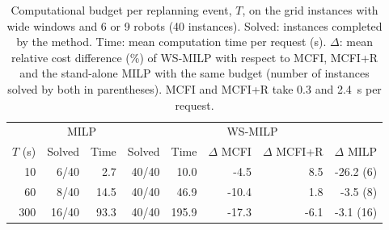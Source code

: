 {\color{red}
\begin{table}[htb]
\centering
\caption{Computational budget per replanning event, $T$, on the grid instances with wide windows and 6 or 9 robots (40 instances). Solved: instances completed by the method. Time: mean computation time per request (s). $\Delta$: mean relative cost difference (\%) of WS-MILP with respect to MCFI, MCFI+R and the stand-alone MILP with the same budget (number of instances solved by both in parentheses). MCFI and MCFI+R take 0.3 and 2.4~s per request.}
\label{tab:budget}
\begin{tabular}{r|rr|rrrrr}
\toprule
 & \multicolumn{2}{c|}{MILP} & \multicolumn{5}{c}{WS-MILP} \\
$T$ (s) & Solved & Time & Solved & Time & $\Delta$ MCFI & $\Delta$ MCFI+R & $\Delta$ MILP \\
\midrule
10 & 6/40 & 2.7 & 40/40 & 10.0 & -4.5 & 8.5 & -26.2 (6) \\
60 & 8/40 & 14.5 & 40/40 & 46.9 & -10.4 & 1.8 & -3.5 (8) \\
300 & 16/40 & 93.3 & 40/40 & 195.9 & -17.3 & -6.1 & -3.1 (16) \\
\bottomrule
\end{tabular}
\end{table}
}
